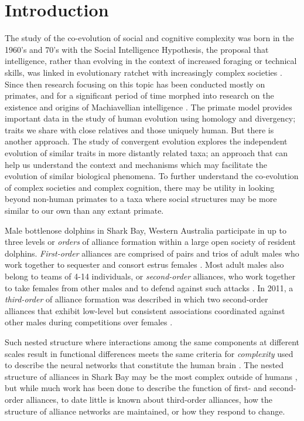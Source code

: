 \documentclass[11pt]{amsart}
\begin{document}
\section{Introduction}

The study of the co-evolution of social and cognitive complexity was born in the 1960's and 70's with the Social Intelligence Hypothesis, the proposal that intelligence, rather than evolving in the context of increased foraging or technical skills, was linked in evolutionary ratchet with increasingly complex societies \citep{jolly:1966, humphrey:1976}. Since then research focusing on this topic has been conducted mostly on primates, and for a significant period of time morphed into research on the existence and origins of Machiavellian intelligence \citep{byrne:1988,byrne:1997}. The primate model provides important data in the study of human evolution using homology and divergency; traits we share with close relatives and those uniquely human. But there is another approach. The study of convergent evolution explores the independent evolution of similar traits in more distantly related taxa; an approach that can help us understand the context and mechanisms which may facilitate the evolution of similar biological phenomena. To further understand the co-evolution of complex societies and complex cognition, there may be utility in looking beyond non-human primates to a taxa where social structures may be more similar to our own than any extant primate.

Male bottlenose dolphins in Shark Bay, Western Australia participate in up to three levels or \textit{orders} of alliance formation within a large open society of resident dolphins. \textit{First-order} alliances are comprised of pairs and trios of adult males who work together to sequester and consort estrus females \citep{connor:1992a}. Most adult males also belong to teams of 4-14 individuals, or \textit{second-order} alliances, who work together to take females from other males and to defend against such attacks \citep{connor:1992a, connor:1992b}. In 2011, a \textit{third-order} of alliance formation was described in which two second-order alliances that exhibit low-level but consistent associations coordinated against other males during competitions over females \citep{connor:2011}. 

Such nested structure where interactions among the same components at different scales result in functional differences meets the same criteria for \textit{complexity} used to describe the neural networks that constitute the human brain \citep{tononi:1994}. The nested structure of alliances in Shark Bay may be the most complex outside of humans \citep{connor:2007}, but while much work has been done to describe the function of first- and second-order alliances, to date little is known about third-order alliances, how the structure of alliance networks are maintained, or how they respond to change.
\end{document}
